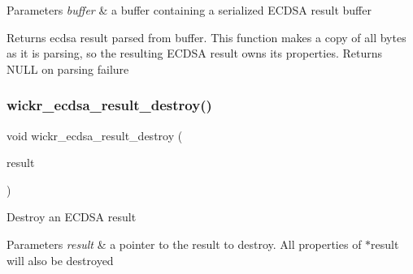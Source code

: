 \begin{DoxyParams}{Parameters}
{\em buffer} & a buffer containing a serialized E\+C\+D\+SA result buffer \\
\hline
\end{DoxyParams}
\begin{DoxyReturn}{Returns}
ecdsa result parsed from \textquotesingle{}buffer\textquotesingle{}. This function makes a copy of all bytes as it is parsing, so the resulting E\+C\+D\+SA result owns its properties. Returns N\+U\+LL on parsing failure 
\end{DoxyReturn}
\mbox{\label{group__wickr__ecdsa__result_ga84fb120b34b4b7ede4042009c735ea5d}} 
\subsubsection{\texorpdfstring{wickr\+\_\+ecdsa\+\_\+result\+\_\+destroy()}{wickr\_ecdsa\_result\_destroy()}}
{\footnotesize\ttfamily void wickr\+\_\+ecdsa\+\_\+result\+\_\+destroy (\begin{DoxyParamCaption}\item[{\hyperlink{structwickr__ecdsa__result}{wickr\+\_\+ecdsa\+\_\+result\+\_\+t} $\ast$$\ast$}]{result }\end{DoxyParamCaption})}

Destroy an E\+C\+D\+SA result


\begin{DoxyParams}{Parameters}
{\em result} & a pointer to the result to destroy. All properties of \textquotesingle{}$\ast$result\textquotesingle{} will also be destroyed \\
\hline
\end{DoxyParams}
\mbox{\label{group__wickr__ecdsa__result_ga417d1186e93d6ae4ee4cf701a2bfb1b2}} 
